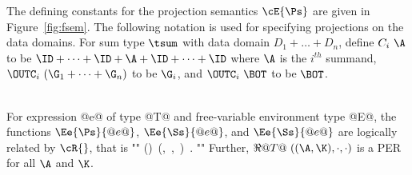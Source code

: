 \documentclass[11pt]{article}
\begin{document}

The defining constants for the projection semantics $\cE{\Ps}$ are
given in Figure~\ref{fig:fsem}. The following notation is used for
specifying projections on the data domains.  For sum type $\tsum$ with
data domain $D_1\plus\ldots\plus D_n$, define $C_i~\A$ to be
$\ID+\cdots+\ID+\A+\ID+\cdots+\ID$ where $\A$ is the $i^{th}$ summand,
$\OUTC_i~(\G_1+\cdots+\G_n)$ to be $\G_i$, and $\OUTC_i~\BOT$ to be
$\BOT$.

\ \\  For expression @e@ of type
@T@ and free-variable environment type @E@, the functions
$\Ee{\Ps}{@e@}$, $\Ee{\Ss}{@e@}$, and $\Ee{\Ss}{@e@}$ are logically
related by $\cR{}$, that is
""
	(\fto{})\ (,\ ,\ )\ .
""
Further, $\Re{}{@T@}~((\A,\K),\cdot,\cdot)$ is a PER for all $\A$ and
$\K$.\ \ %
\end{document}
